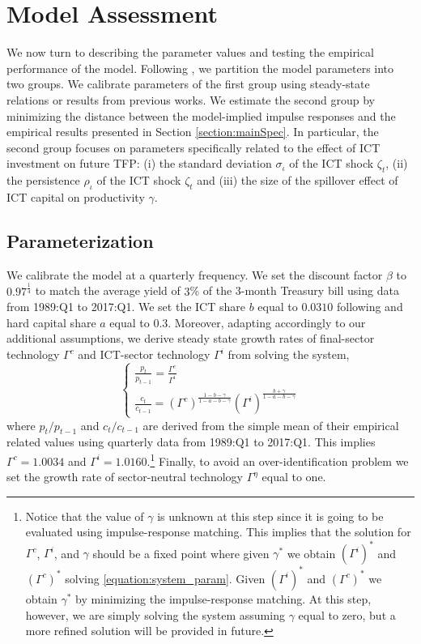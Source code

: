 \documentclass[12pt]{article}
\begin{document}
\section{Model Assessment}\label{section:model_assessment}

We now turn to describing the parameter values and testing the empirical performance of the model. Following \cite{christiano2005nominal}, we partition the model parameters into two groups. We calibrate parameters of the first group using steady-state relations or results from previous works. We estimate the second group by minimizing the distance between the model-implied impulse responses and the empirical results presented in Section \ref{section:mainSpec}. In particular, the second group focuses on parameters specifically related to the effect of ICT investment on future TFP: (i) the standard deviation $\sigma_{\iota}$ of the ICT shock $\zeta_t$, (ii) the persistence $\rho_{\iota}$ of the ICT shock $\zeta_t$ and (iii) the size of the spillover effect of ICT capital on productivity $\gamma$. 

\subsection{Parameterization}\label{section:parameterization}

We calibrate the model at a quarterly frequency. We set the discount factor $\beta$ to $0.97^{\frac{1}{4}}$ to match the average yield of $3$\% of the 3-month Treasury bill using data from 1989:Q1 to 2017:Q1. We set the ICT share $b$ equal to $0.0310$ following \cite{oulton2012long} and hard capital share $a$ equal to $0.3$. Moreover, adapting \cite{oulton2012long} accordingly to our additional assumptions, we derive steady state growth rates of final-sector technology $\Gamma^c$ and ICT-sector technology $\Gamma^i$ from solving the system,
\begin{equation}\label{equation:system_param}
\begin{cases}
 \frac{p_t}{p_{t-1}}  = \frac{\Gamma^c}{\Gamma^i} \\
 \frac{c_t}{c_{t-1}}  = (\Gamma^c)^{\frac{1-b-\gamma}{1-a-b-\gamma}}  (\Gamma^i)^{\frac{b+\gamma}{1-a-b-\gamma}}
\end{cases}
\end{equation}
where $p_t/p_{t-1}$ and $c_t/c_{t-1}$ are derived from the simple mean of their empirical related values using quarterly data from 1989:Q1 to 2017:Q1. This implies $\Gamma^c = 1.0034$ and $\Gamma^i = 1.0160$.\footnote{Notice that the value of $\gamma$ is unknown at this step since it is going to be evaluated using impulse-response matching. This implies that the solution for $\Gamma^c$, $\Gamma^i$, and $\gamma$ should be a fixed point where given $\gamma^*$ we obtain $(\Gamma^i)^*$ and $(\Gamma^c)^*$ solving \ref{equation:system_param}. Given $(\Gamma^i)^*$ and $(\Gamma^c)^*$ we obtain $\gamma^*$ by minimizing the impulse-response matching. At this step, however, we are simply solving the system assuming $\gamma$ equal to zero, but a more refined solution will be provided in future.} Finally, to avoid an over-identification problem we set the growth rate of sector-neutral technology $\Gamma^{\eta}$ equal to one.
\end{document}

